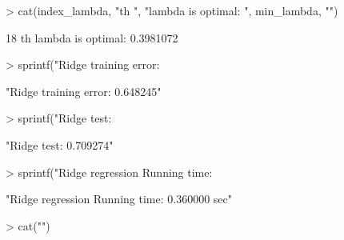 \documentclass{article}
\begin{document}
\begin{Schunk}
\begin{Sinput}
> cat(index_lambda, "th ", "lambda is optimal: ", min_lambda, "\n")
\end{Sinput}
\begin{Soutput}
18 th  lambda is optimal:  0.3981072 
\end{Soutput}
\begin{Sinput}
> sprintf("Ridge training error: %f", wine_train_err_lr2)
\end{Sinput}
\begin{Soutput}
[1] "Ridge training error: 0.648245"
\end{Soutput}
\begin{Sinput}
> sprintf("Ridge test: %f",wine_test_err_lr2)
\end{Sinput}
\begin{Soutput}
[1] "Ridge test: 0.709274"
\end{Soutput}
\begin{Sinput}
> sprintf("Ridge regression Running time: %f sec",(ptm_lr[3]))
\end{Sinput}
\begin{Soutput}
[1] "Ridge regression Running time: 0.360000 sec"
\end{Soutput}
\begin{Sinput}
> cat("\n")
\end{Sinput}
\begin{Soutput}


\end{Soutput}
\end{Schunk}
\end{document}

